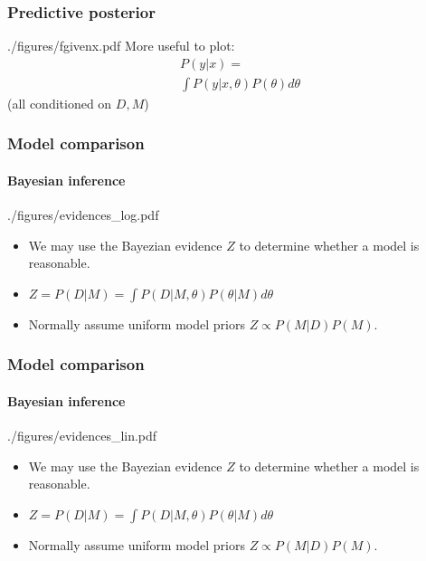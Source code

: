 \documentclass[%
]{beamer}
\begin{document}
\begin{frame}
    \frametitle{Predictive posterior}
    \begin{figright}[0.4]{./figures/fgivenx.pdf}
        More useful to plot:
        \begin{align}
        &P(y|x) = \nonumber\\
        &\int P(y|x,\theta) P(\theta) d\theta \nonumber
        \end{align}
        (all conditioned on $D,M$)
    \end{figright}
\end{frame}

\begin{frame}
    \frametitle{Model comparison}
    \framesubtitle{Bayesian inference}
    \begin{figright}[0.33]{./figures/evidences_log.pdf}
        \begin{itemize}
            \item We may use the Bayezian evidence $Z$ to determine whether a model is reasonable.
            \item $Z = P(D|M) = \int P(D|M,\theta)P(\theta|M)d\theta$
            \item Normally assume uniform model priors $Z \propto P(M|D)P(M)$.
        \end{itemize}
    \end{figright}
\end{frame}
\begin{frame}
    \frametitle{Model comparison}
    \framesubtitle{Bayesian inference}
    \begin{figright}[0.33]{./figures/evidences_lin.pdf}
        \begin{itemize}
            \item We may use the Bayezian evidence $Z$ to determine whether a model is reasonable.
            \item $Z = P(D|M) = \int P(D|M,\theta)P(\theta|M)d\theta$
            \item Normally assume uniform model priors $Z \propto P(M|D)P(M)$.
        \end{itemize}
    \end{figright}
\end{frame}
\end{document}
